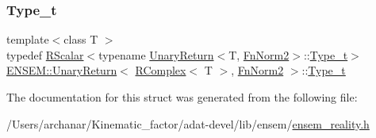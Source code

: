 \mbox{\label{structENSEM_1_1UnaryReturn_3_01RComplex_3_01T_01_4_00_01FnNorm2_01_4_a6b6070508bed1e14a03db04ab901526a}} 
\subsubsection{\texorpdfstring{Type\_t}{Type\_t}\hspace{0.1cm}{\footnotesize\ttfamily [3/3]}}
{\footnotesize\ttfamily template$<$class T $>$ \\
typedef \mbox{\hyperlink{classENSEM_1_1RScalar}{R\+Scalar}}$<$typename \mbox{\hyperlink{structENSEM_1_1UnaryReturn}{Unary\+Return}}$<$T, \mbox{\hyperlink{structENSEM_1_1FnNorm2}{Fn\+Norm2}}$>$\+::\mbox{\hyperlink{structENSEM_1_1UnaryReturn_3_01RComplex_3_01T_01_4_00_01FnNorm2_01_4_a6b6070508bed1e14a03db04ab901526a}{Type\+\_\+t}}$>$ \mbox{\hyperlink{structENSEM_1_1UnaryReturn}{E\+N\+S\+E\+M\+::\+Unary\+Return}}$<$ \mbox{\hyperlink{classENSEM_1_1RComplex}{R\+Complex}}$<$ T $>$, \mbox{\hyperlink{structENSEM_1_1FnNorm2}{Fn\+Norm2}} $>$\+::\mbox{\hyperlink{structENSEM_1_1UnaryReturn_3_01RComplex_3_01T_01_4_00_01FnNorm2_01_4_a6b6070508bed1e14a03db04ab901526a}{Type\+\_\+t}}}



The documentation for this struct was generated from the following file\+:\begin{DoxyCompactItemize}
\item 
/\+Users/archanar/\+Kinematic\+\_\+factor/adat-\/devel/lib/ensem/\mbox{\hyperlink{adat-devel_2lib_2ensem_2ensem__reality_8h}{ensem\+\_\+reality.\+h}}\end{DoxyCompactItemize}
